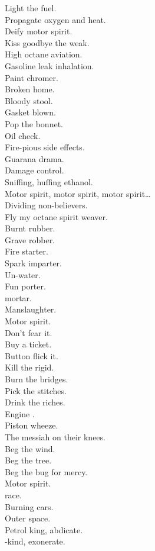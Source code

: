 Light the fuel. \\
Propagate oxygen and heat. \\
Deify motor spirit. \\
Kiss goodbye the weak. \\

High octane aviation. \\
Gasoline leak inhalation. \\
Paint chromer. \\
Broken home. \\
Bloody stool. \\
Gasket blown. \\
Pop the bonnet. \\
Oil check. \\
Fire-pious side effects. \\
Guarana drama. \\
Damage control. \\
Sniffing, huffing ethanol. \\

Motor spirit, motor spirit, motor spirit… \\

Dividing non-believers. \\
Fly my octane spirit weaver. \\

Burnt rubber. \\
Grave robber. \\
Fire starter. \\
Spark imparter. \\
Un-water. \\
Fun porter. \\
 mortar. \\
Manslaughter. \\
Motor spirit. \\
Don't fear it. \\
Buy a ticket. \\
Button flick it. \\
Kill the rigid. \\
Burn the bridges. \\
Pick the stitches. \\
Drink the riches. \\

Engine . \\
Piston wheeze. \\
The messiah on their knees. \\
Beg the wind. \\
Beg the tree. \\
Beg the bug for mercy. \\
Motor spirit. \\
 race. \\
Burning cars. \\
Outer space. \\
Petrol king, abdicate. \\
-kind, exonerate. \\


